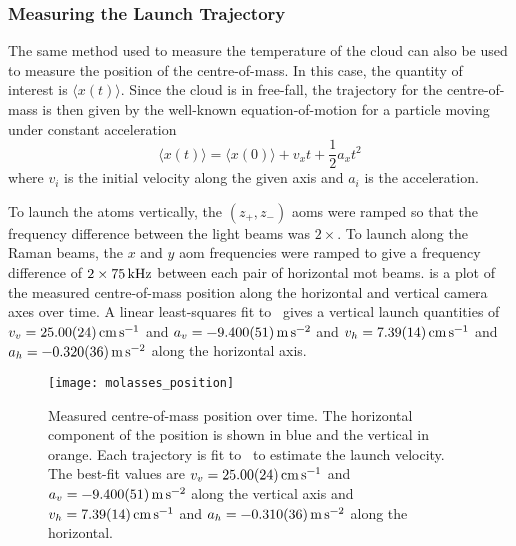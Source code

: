 \subsubsection{Measuring the Launch Trajectory}
The same method used to measure the temperature of the cloud can also
be used to measure the position of the centre-of-mass. In this case,
the quantity of interest is \(\langle x(t)\rangle\). Since the cloud
is in free-fall, the trajectory for the centre-of-mass is then given
by the well-known equation-of-motion for a particle moving under
constant acceleration
\begin{equation}
  \langle x(t) \rangle = \langle x(0) \rangle + v_x t + \frac{1}{2} a_x t^2
  \label{eq:position_free}
\end{equation}
where \(v_i\) is the initial velocity along the given axis and \(a_i\)
is the acceleration.
\par\noindent
To launch the atoms vertically, the \((z_+, z_-)\) \acp{aom} were
ramped so that the frequency difference between the light beams was
\(2\times\). To launch along the Raman
beams, the \(x\) and \(y\) \ac{aom}
frequencies were ramped to give a frequency difference of \(2\times
\sivalue{75}{\kilo\hertz}\) between each pair of horizontal \ac{mot} beams.
 is a plot of the measured
centre-of-mass position along the horizontal and vertical camera axes
over time. A linear least-squares fit
to~ gives a vertical launch quantities
of \(v_v = \sivalue{25.0\pm0.24}{\centi\meter\per\second}\) and \(a_v
= \sivalue{-9.40\pm0.051}{\metre\per\second\squared}\) and \(v_h =
\sivalue{7.39\pm0.14}{\centi\meter\per\second}\) and \(a_h =
\sivalue{-0.32\pm0.036}{\metre\per\second\squared}\) along the
horizontal axis. 
\begin{figure}[!htbp]
  \centering
  \texttt{[image: molasses\_position]}
  \caption[Atom cloud centre-of-mass over time]{Measured
    centre-of-mass position over time. The horizontal component of the
    position is shown in blue and the vertical in orange. Each
    trajectory is fit to~ to estimate the
    launch velocity. The best-fit values are \(v_v =
    \sivalue{25.0\pm0.24}{\centi\meter\per\second}\) and \(a_v =
    \sivalue{-9.40\pm0.051}{\metre\per\second\squared}\) along the
    vertical axis and \(v_h =
    \sivalue{7.39\pm0.14}{\centi\meter\per\second}\) and \(a_h =
    \sivalue{-0.31\pm0.036}{\metre\per\second\squared}\) along the
  horizontal.}
  \label{fig:molasses_position}
\end{figure}
